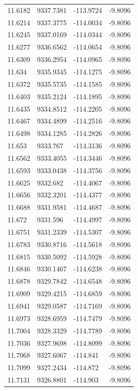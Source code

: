 \begin{table}[H]
\begin{tabular}{llll}
11.6182 & 9337.7381 & -113.9724 & -9.8096 \\
11.6214 & 9337.3775 & -114.0034 & -9.8096 \\
11.6245 & 9337.0169 & -114.0344 & -9.8096 \\
11.6277 & 9336.6562 & -114.0654 & -9.8096 \\
11.6309 & 9336.2954 & -114.0965 & -9.8096 \\
11.634 & 9335.9345 & -114.1275 & -9.8096 \\
11.6372 & 9335.5735 & -114.1585 & -9.8096 \\
11.6403 & 9335.2124 & -114.1895 & -9.8096 \\
11.6435 & 9334.8512 & -114.2205 & -9.8096 \\
11.6467 & 9334.4899 & -114.2516 & -9.8096 \\
11.6498 & 9334.1285 & -114.2826 & -9.8096 \\
11.653 & 9333.767 & -114.3136 & -9.8096 \\
11.6562 & 9333.4055 & -114.3446 & -9.8096 \\
11.6593 & 9333.0438 & -114.3756 & -9.8096 \\
11.6625 & 9332.682 & -114.4067 & -9.8096 \\
11.6656 & 9332.3201 & -114.4377 & -9.8096 \\
11.6688 & 9331.9581 & -114.4687 & -9.8096 \\
11.672 & 9331.596 & -114.4997 & -9.8096 \\
11.6751 & 9331.2339 & -114.5307 & -9.8096 \\
11.6783 & 9330.8716 & -114.5618 & -9.8096 \\
11.6815 & 9330.5092 & -114.5928 & -9.8096 \\
11.6846 & 9330.1467 & -114.6238 & -9.8096 \\
11.6878 & 9329.7842 & -114.6548 & -9.8096 \\
11.6909 & 9329.4215 & -114.6859 & -9.8096 \\
11.6941 & 9329.0587 & -114.7169 & -9.8096 \\
11.6973 & 9328.6959 & -114.7479 & -9.8096 \\
11.7004 & 9328.3329 & -114.7789 & -9.8096 \\
11.7036 & 9327.9698 & -114.8099 & -9.8096 \\
11.7068 & 9327.6067 & -114.841 & -9.8096 \\
11.7099 & 9327.2434 & -114.872 & -9.8096 \\
11.7131 & 9326.8801 & -114.903 & -9.8096 \\

\end{tabular}
\end{table}
